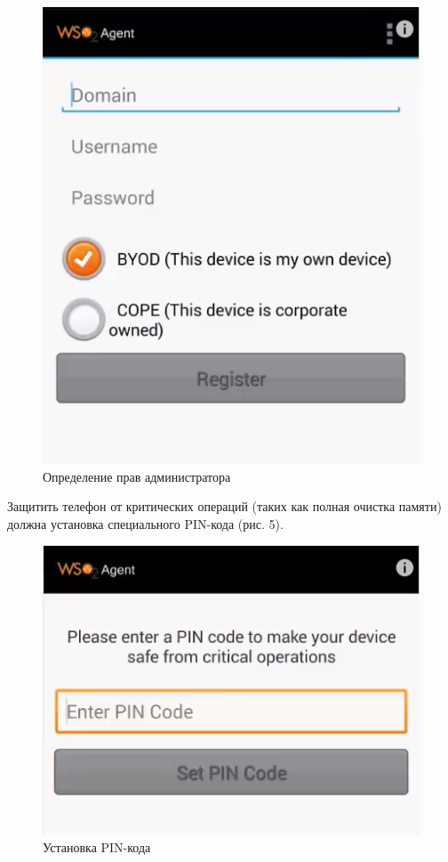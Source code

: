\documentclass[a4paper, 12pt]{article}		%
\begin{document}
\begin{figure}[h!]
\centering
\includegraphics[scale=0.65]{res/EMM004}
\caption{Определение прав администратора}
\end{figure}

Защитить телефон от критических операций (таких как полная очистка памяти) должна установка специального PIN-кода (рис. 5).

\begin{figure}[h!]
\centering
\includegraphics[scale=0.65]{res/EMM005}
\caption{Установка PIN-кода}
\end{figure}
\end{document}
